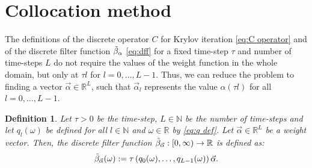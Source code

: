 \documentclass[a4paper,11pt,bibliography=totoc,listof=totoc,headinclude=true,cleardoublepage=empty,oneside]{scrbook}
\newtheorem{definition}[theorem]{Definition}
\newcommand{\R}{\mathbb{R}}
\newcommand{\N}{\mathbb{N}}
\newcommand{\dff}{\Tilde{\beta}_\alpha}
\newcommand{\dffv}{\Tilde{\beta}_{\Vec{\alpha}}}
\newcommand{\e}{\mathrm{end}}
\begin{document}

\section{Collocation method}\label{section:collocation}
The definitions of the discrete operator $C$ for Krylov iteration \eqref{eq:C operator} and of the discrete filter function $\dff$ \eqref{eq:dff} for a fixed time-step $\tau$ and number of time-steps $L$ do not require the values of the weight function in the whole domain, but only at $\tau l$ for $l=0, \dots, L-1$. Thus, we can reduce the problem to finding a vector $\Vec{\alpha} \in \R^L$, such that $\Vec{\alpha}_l$ represents the value $\alpha(\tau l)$ for all $l=0, \dots, L-1$.

\begin{definition}\label{def:dffv}
    Let $\tau > 0$ be the time-step, $L\in \N$ be the number of time-steps and let $q_l(\omega)$ be defined for all $l \in \N$ and $\omega \in \R$ by \eqref{eq:q def}. Let $\Vec{\alpha}\in\R^L$ be a weight vector. Then, the discrete filter function $\dffv: [0, \infty) \rightarrow \R$ is defined as:
    \begin{equation}\label{eq:dffv}
        \dffv (\omega) := \tau \left(q_0(\omega), \dots, q_{L-1}(\omega)\right) \Vec{\alpha}. 
    \end{equation}
\end{definition}
\end{document}
